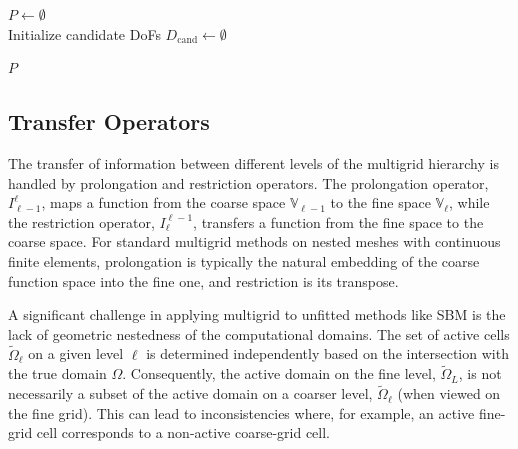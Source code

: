 \documentclass{elsarticle}
\begin{document}
\begin{algorithm}[ht]
    \caption{CollectFullResidualDoFs (Enforce Full Residual Property)}
    \label{alg:dof_collection}
    \DontPrintSemicolon


    $P \gets \emptyset$ \\
    Initialize candidate DoFs $D_{\text{cand}} \gets \emptyset$ \\

    \Return $P$
\end{algorithm}

\subsection{Transfer Operators}
\label{sec:transfer_operators}
The transfer of information between different levels of the multigrid hierarchy is handled by prolongation and
restriction operators. The prolongation operator, $I_{\ell-1}^\ell$, maps a function from the coarse space
$\mathbb{V}_{\ell-1}$ to the fine space $\mathbb{V}_\ell$, while the restriction operator, $I_\ell^{\ell-1}$, transfers
a function from the fine space to the coarse space. For standard multigrid methods on nested meshes with continuous
finite elements, prolongation is typically the natural embedding of the coarse function space into the fine one, and
restriction is its transpose.

A significant challenge in applying multigrid to unfitted methods like SBM is the lack of geometric nestedness of the
computational domains. The set of active cells $\tilde{\Omega}_\ell$ on a given level $\ell$ is determined
independently based on the intersection with the true domain $\Omega$. Consequently, the active domain on the fine
level, $\tilde{\Omega}_L$, is not necessarily a subset of the active domain on a coarser level, $\tilde{\Omega}_{\ell}$
(when viewed on the fine grid). This can lead to inconsistencies where, for example, an active fine-grid cell
corresponds to a non-active coarse-grid cell.
\end{document}
